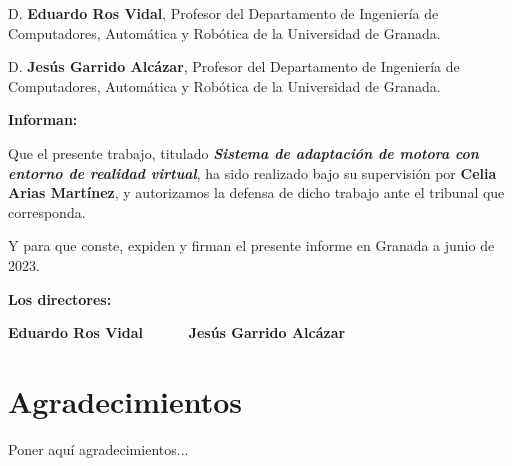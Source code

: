 D. \textbf{Eduardo Ros Vidal}, Profesor del Departamento de Ingeniería de Computadores, Automática y Robótica de la Universidad de Granada.

\vspace{0.5cm}

D. \textbf{Jesús Garrido Alcázar}, Profesor  del Departamento de Ingeniería de Computadores, Automática y Robótica de la Universidad de Granada.


\vspace{0.5cm}

\textbf{Informan:}

\vspace{0.5cm}

Que el presente trabajo, titulado \textit{\textbf{Sistema de adaptación de motora con entorno de realidad virtual}},
ha sido realizado bajo su supervisión por \textbf{Celia Arias Martínez}, y autorizamos la defensa de dicho trabajo ante el tribunal
que corresponda.

\vspace{0.5cm}

Y para que conste, expiden y firman el presente informe en Granada a junio de 2023.

\vspace{1cm}

\textbf{Los directores:}

\vspace{5cm}

\noindent \textbf{Eduardo Ros Vidal \ \ \ \ \  Jesús Garrido Alcázar}

\chapter*{Agradecimientos}
\thispagestyle{empty}

       \vspace{1cm}


Poner aquí agradecimientos...


